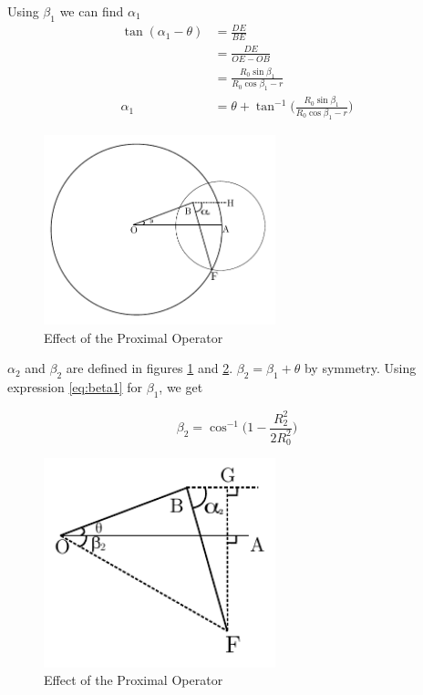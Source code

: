 Using $\beta_1$ we can find $\alpha_1$
\begin{align*}
	\tan(\alpha_1 - \theta) &= \frac{DE}{BE} \\[2ex]
							&= \frac{DE}{OE-OB}\\[2ex]
							&= \frac{R_0 \sin\beta_1}{R_0\cos\beta_1 - r} \\[2ex]
	\alpha_1 &= \theta + \tan^{-1}\bigg( \frac{R_0 \sin\beta_1}{R_0\cos\beta_1 - r}\bigg) 
\end{align*}
\begin{figure}[h]
\centering \vspace{-0.1in}
\includegraphics[width=0.6\textwidth]{images/geo5.pdf}
\vspace{-20pt} \caption[Effect of the proximal Operator]{\small Effect of the Proximal Operator }
\label{fig:alpha2}
\end{figure}
$\alpha_2$ and $\beta_2$ are defined in figures \ref{fig:alpha2} and \ref{fig:alpha21}. $\beta_2 = \beta_1 + \theta$ by symmetry. Using expression \ref{eq:beta1} for $\beta_1$, we get

\begin{equation}\label{eq:beta2}
	\beta_2 = \cos^{-1}\bigg(1-\frac{R_2^2}{2R_0^2}\bigg)
\end{equation}

\begin{figure}[h]
\centering \vspace{-0.1in}
\includegraphics[width=0.6\textwidth]{images/geo6.pdf}
\vspace{-20pt} \caption[Effect of the proximal Operator]{\small Effect of the Proximal Operator }
\label{fig:alpha21}
\end{figure}

